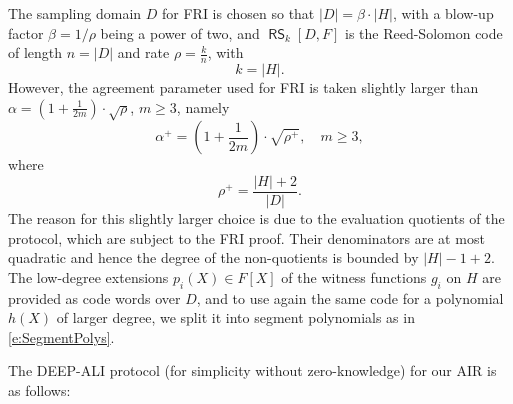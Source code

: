 \documentclass[11pt,article,oneside]{memoir}
\theoremstyle{definition}
\theoremstyle{remark}
\DeclareMathOperator{\RS}{\mathsf{RS}}
\begin{document}
The sampling domain $D$ for FRI is chosen so that $|D|=\beta\cdot |H|$, with a blow-up factor $\beta =1/\rho$ being a power of two, and $\RS_k[D,F]$ is the Reed-Solomon code of length $n= |D|$ and rate $\rho=\frac{k}{n}$, with
\begin{equation}
k = |H|.
\end{equation}
However, the agreement parameter used for FRI is taken slightly larger than $\alpha = \left(1+\frac{1}{2m}\right)\cdot\sqrt\rho$, $m\geq 3$, namely 
\begin{equation}
\alpha^+= \left(1+\frac{1}{2m}\right)\cdot \sqrt{\rho^+}, \quad m\geq 3, 
\end{equation}
where 
\begin{equation}
\rho^+=\frac{|H|+2}{|D|}.
\end{equation}
The reason for this slightly larger choice is due to the evaluation quotients of the protocol, which are subject to the FRI proof. 
Their denominators are at most quadratic and hence the degree of the non-quotients is bounded by $|H|-1 + 2$.
The low-degree extensions $p_i(X)\in F[X]$ of the witness functions $g_i$ on $H$ are provided as code words over $D$, and to use again the same code for a polynomial $h(X)$ of larger degree, we split it into segment polynomials as in \eqref{e:SegmentPolys}. 


The DEEP-ALI protocol (for simplicity without zero-knowledge) for our AIR is as follows: 
\end{document}
